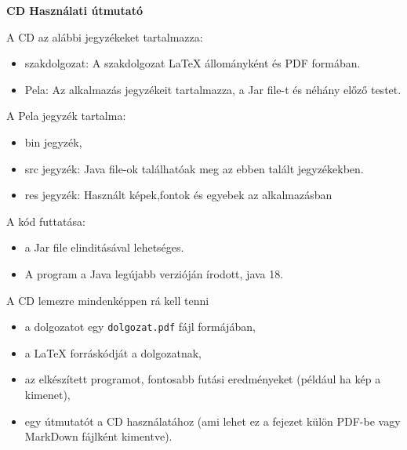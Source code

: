 \pagestyle{empty}

\noindent \textbf{\Large CD Használati útmutató}

\vskip 1cm

A CD az alábbi jegyzékeket tartalmazza:

\begin{itemize}
    \item szakdolgozat: A szakdolgozat LaTeX állományként és PDF formában.
    \item Pela: Az alkalmazás jegyzékeit tartalmazza, a Jar file-t és néhány előző testet.
\end{itemize}

A Pela jegyzék tartalma:

\begin{itemize}
    \item bin jegyzék,
    \item src jegyzék: Java file-ok találhatóak meg az ebben talált jegyzékekben.
    \item res jegyzék: Használt képek,fontok és egyebek az alkalmazásban
\end{itemize}

A kód futtatása:

\begin{itemize}
    \item a Jar file elinditásával lehetséges.
    \item A program a Java legújabb verzióján írodott, java 18.
\end{itemize}

A CD lemezre mindenképpen rá kell tenni
\begin{itemize}
\item a dolgozatot egy \texttt{dolgozat.pdf} fájl formájában,
\item a LaTeX forráskódját a dolgozatnak,
\item az elkészített programot, fontosabb futási eredményeket (például ha kép a kimenet),
\item egy útmutatót a CD használatához (ami lehet ez a fejezet külön PDF-be vagy MarkDown fájlként kimentve).
\end{itemize}
